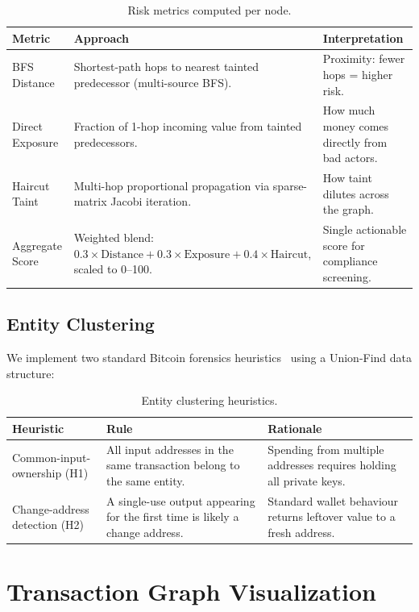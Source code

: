 \documentclass[a4paper,11pt]{article}
\begin{document}
\begin{table}[H]
\centering
\small
\caption{Risk metrics computed per node.}
\begin{tabularx}{\textwidth}{@{}lXX@{}}
\toprule
\textbf{Metric} & \textbf{Approach} & \textbf{Interpretation} \\
\midrule
BFS Distance & Shortest-path hops to nearest tainted predecessor (multi-source BFS). & Proximity: fewer hops = higher risk. \\
Direct Exposure & Fraction of 1-hop incoming value from tainted predecessors. & How much money comes directly from bad actors. \\
Haircut Taint & Multi-hop proportional propagation via sparse-matrix Jacobi iteration. & How taint dilutes across the graph. \\
Aggregate Score & Weighted blend: $0.3 \times \text{Distance} + 0.3 \times \text{Exposure} + 0.4 \times \text{Haircut}$, scaled to 0--100. & Single actionable score for compliance screening. \\
\bottomrule
\end{tabularx}
\end{table}

\subsection{Entity Clustering}

We implement two standard Bitcoin forensics heuristics~\cite{meiklejohn2013} using a Union-Find data structure:

\begin{table}[H]
\centering
\small
\caption{Entity clustering heuristics.}
\begin{tabularx}{\textwidth}{@{}lXX@{}}
\toprule
\textbf{Heuristic} & \textbf{Rule} & \textbf{Rationale} \\
\midrule
Common-input-ownership (H1) & All input addresses in the same transaction belong to the same entity. & Spending from multiple addresses requires holding all private keys. \\
Change-address detection (H2) & A single-use output appearing for the first time is likely a change address. & Standard wallet behaviour returns leftover value to a fresh address. \\
\bottomrule
\end{tabularx}
\end{table}

\section{Transaction Graph Visualization}
\end{document}

